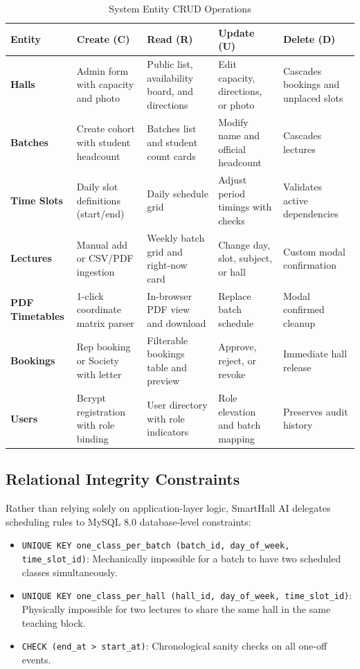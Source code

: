 \documentclass[11pt,a4paper]{article}
\begin{document}
\begin{table}[H]
    \centering
    \caption{System Entity CRUD Operations}
    \small
    \begin{tabular}{p{2.5cm}p{3cm}p{3.5cm}p{3cm}p{2.5cm}}
        \toprule
        \textbf{Entity} & \textbf{Create (C)} & \textbf{Read (R)} & \textbf{Update (U)} & \textbf{Delete (D)} \\
        \midrule
        \textbf{Halls} & Admin form with capacity and photo & Public list, availability board, and directions & Edit capacity, directions, or photo & Cascades bookings and unplaced slots \\
        \textbf{Batches} & Create cohort with student headcount & Batches list and student count cards & Modify name and official headcount & Cascades lectures \\
        \textbf{Time Slots} & Daily slot definitions (start/end) & Daily schedule grid & Adjust period timings with checks & Validates active dependencies \\
        \textbf{Lectures} & Manual add or CSV/PDF ingestion & Weekly batch grid and right-now card & Change day, slot, subject, or hall & Custom modal confirmation \\
        \textbf{PDF Timetables} & 1-click coordinate matrix parser & In-browser PDF view and download & Replace batch schedule & Modal confirmed cleanup \\
        \textbf{Bookings} & Rep booking or Society with letter & Filterable bookings table and preview & Approve, reject, or revoke & Immediate hall release \\
        \textbf{Users} & Bcrypt registration with role binding & User directory with role indicators & Role elevation and batch mapping & Preserves audit history \\
        \bottomrule
    \end{tabular}
\end{table}

\subsection{Relational Integrity Constraints}
Rather than relying solely on application-layer logic, SmartHall AI delegates scheduling rules to MySQL 8.0 database-level constraints:
\begin{itemize}
    \item \texttt{UNIQUE KEY one\_class\_per\_batch (batch\_id, day\_of\_week, time\_slot\_id)}: Mechanically impossible for a batch to have two scheduled classes simultaneously.
    \item \texttt{UNIQUE KEY one\_class\_per\_hall (hall\_id, day\_of\_week, time\_slot\_id)}: Physically impossible for two lectures to share the same hall in the same teaching block.
    \item \texttt{CHECK (end\_at > start\_at)}: Chronological sanity checks on all one-off events.
\end{itemize}
\end{document}
